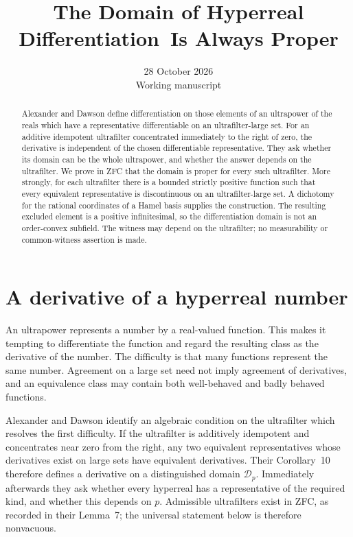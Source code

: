 \documentclass[11pt]{article}
\title{The Domain of Hyperreal Differentiation\ Is Always Proper}
\author{}
\date{28 October 2026\\Working manuscript}
\begin{document}
\maketitle
\begin{abstract}
Alexander and Dawson define differentiation on those elements of an
ultrapower of the reals which have a representative differentiable on an
ultrafilter-large set. For an additive idempotent ultrafilter concentrated
immediately to the right of zero, the derivative is independent of the
chosen differentiable representative. They ask whether its domain can be
the whole ultrapower, and whether the answer depends on the ultrafilter.
We prove in ZFC that the domain is proper for every such ultrafilter.
More strongly, for each ultrafilter there is a bounded strictly positive
function such that every equivalent representative is discontinuous on
an ultrafilter-large set. A dichotomy for the rational coordinates of a
Hamel basis supplies the construction. The resulting excluded element
is a positive infinitesimal, so the differentiation domain is not an
order-convex subfield. The witness may depend on the ultrafilter; no
measurability or common-witness assertion is made.
\end{abstract}
\tableofcontents

\section{A derivative of a hyperreal number}

An ultrapower represents a number by a real-valued function. This makes
it tempting to differentiate the function and regard the resulting class
as the derivative of the number. The difficulty is that many functions
represent the same number. Agreement on a large set need not imply
agreement of derivatives, and an equivalence class may contain both
well-behaved and badly behaved functions.

Alexander and Dawson \cite{AD} identify an algebraic condition on the
ultrafilter which resolves the first difficulty. If the ultrafilter is
additively idempotent and concentrates near zero from the right, any two
equivalent representatives whose derivatives exist on large sets have
equivalent derivatives. Their Corollary~10 therefore defines a derivative
on a distinguished domain $\mathcal D_p$. Immediately afterwards they ask
whether every hyperreal has a representative of the required kind, and
whether this depends on $p$.
Admissible ultrafilters exist in ZFC, as recorded in their Lemma~7;
the universal statement below is therefore nonvacuous.
\end{document}
